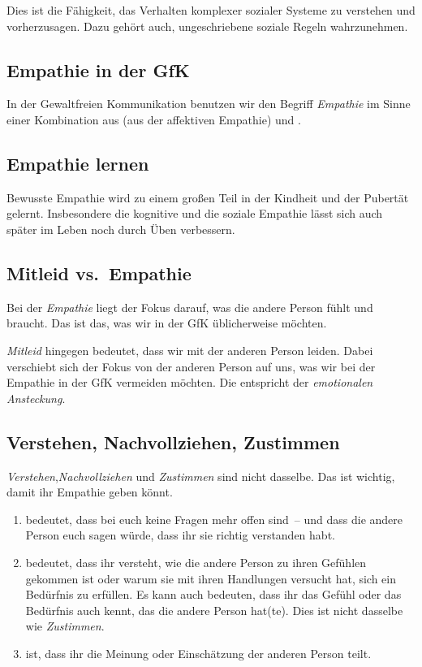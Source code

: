Dies ist die Fähigkeit, das Verhalten komplexer sozialer Systeme zu verstehen und vorherzusagen. Dazu gehört auch, ungeschriebene soziale Regeln wahrzunehmen.


\subsection{Empathie in der GfK}

In der Gewaltfreien Kommunikation benutzen wir den Begriff \emph{Empathie} im Sinne einer Kombination aus  (aus der affektiven Empathie) und .


\subsection{Empathie lernen}

Bewusste Empathie wird zu einem großen Teil in der Kindheit und der Pubertät gelernt. Insbesondere die kognitive und die soziale Empathie lässt sich auch später im Leben noch durch Üben verbessern.


\subsection{Mitleid vs.~Empathie}
\label{mitleid}

Bei der \emph{Empathie} liegt der Fokus darauf, was die andere Person fühlt und braucht. Das ist das, was wir in der GfK üblicherweise möchten.

\emph{Mitleid} hingegen bedeutet, dass wir mit der anderen Person leiden. Dabei verschiebt sich der Fokus von der anderen Person auf uns, was wir bei der Empathie in der GfK vermeiden möchten. Die entspricht der \emph{emotionalen Ansteckung}.


\subsection{Verstehen, Nachvollziehen, Zustimmen}

\emph{Verstehen},\emph{Nachvollziehen} und \emph{Zustimmen} sind nicht dasselbe. Das ist wichtig, damit ihr Empathie geben könnt.

\begin{enumerate}
  \item {} bedeutet, dass bei euch keine Fragen mehr offen sind~-- und dass die andere Person euch sagen würde, dass ihr sie richtig verstanden habt.
  \item {} bedeutet, dass ihr versteht, wie die andere Person zu ihren Gefühlen gekommen ist oder warum sie mit ihren Handlungen versucht hat, sich ein Bedürfnis zu erfüllen. Es kann auch bedeuten, dass ihr das Gefühl oder das Bedürfnis auch kennt, das die andere Person hat(te). Dies ist nicht dasselbe wie \emph{Zustimmen}.
  \item {} ist, dass ihr die Meinung oder Einschätzung der anderen Person teilt.
\end{enumerate}

